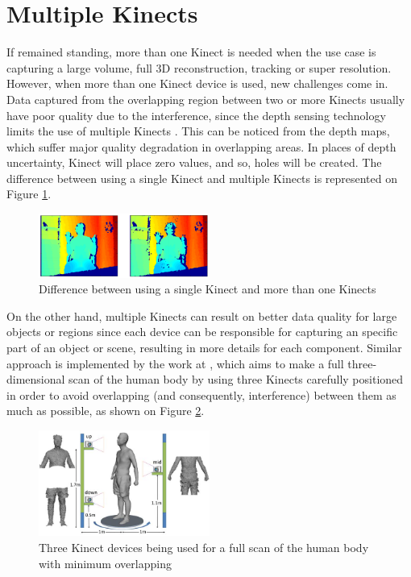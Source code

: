 \documentclass[msc, a4paper, classic, en]{ufbathesis}
\begin{document}
\section{Multiple Kinects}

If remained standing, more than one Kinect is needed when the use case is capturing a large volume, full 3D reconstruction, tracking or super resolution. However, when more than one Kinect device is used, new challenges come in. Data captured from the overlapping region between two or more Kinects usually have poor quality due to the interference, since the depth sensing technology limits the use of multiple Kinects \cite{roy}. This can be noticed from the depth maps, which suffer major quality degradation in overlapping areas. In places of depth uncertainty, Kinect will place zero values, and so, holes will be created. The difference between using a single Kinect and multiple Kinects is represented on Figure \ref{fig:twokin}. 

\begin{figure}
\centering
\includegraphics[width=0.5\textwidth]{images/twokin.png}
\caption{Difference between using a single Kinect and more than one Kinects}
\label{fig:twokin}
\end{figure}

On the other hand, multiple Kinects can result on better data quality for large objects or regions since each device can be responsible for capturing an specific part of an object or scene, resulting in more details for each component. Similar approach is implemented by the work at \cite{tong}, which aims to make a full three-dimensional scan of the human body by using three Kinects carefully positioned in order to avoid overlapping (and consequently, interference) between them as much as possible, as shown on Figure \ref{fig:3kin}.

\begin{figure}
\centering
\includegraphics[width=0.5\textwidth]{images/3kin.jpg}
\caption{Three Kinect devices being used for a full scan of the human body with minimum overlapping \cite{tong}}
\label{fig:3kin}
\end{figure}
\end{document}

